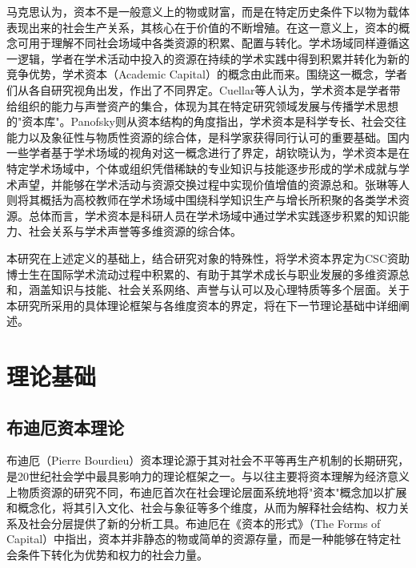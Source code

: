 马克思认为，资本不是一般意义上的物或财富，而是在特定历史条件下以物为载体表现出来的社会生产关系，其核心在于价值的不断增殖\cite{marx2004}。在这一意义上，资本的概念可用于理解不同社会场域中各类资源的积累、配置与转化。学术场域同样遵循这一逻辑，学者在学术活动中投入的资源在持续的学术实践中得到积累并转化为新的竞争优势，学术资本（Academic Capital）的概念由此而来。围绕这一概念，学者们从各自研究视角出发，作出了不同界定。Cuellar等人认为，学术资本是学者带给组织的能力与声誉资产的集合，体现为其在特定研究领域发展与传播学术思想的"资本库"\cite{cuellar2016}。Panofsky则从资本结构的角度指出，学术资本是科学专长、社会交往能力以及象征性与物质性资源的综合体，是科学家获得同行认可的重要基础\cite{panofsky2011}。国内一些学者基于学术场域的视角对这一概念进行了界定，胡钦晓认为，学术资本是在特定学术场域中，个体或组织凭借稀缺的专业知识与技能逐步形成的学术成就与学术声望，并能够在学术活动与资源交换过程中实现价值增值的资源总和\cite{huqinxiao2020}。张琳等人则将其概括为高校教师在学术场域中围绕科学知识生产与增长所积聚的各类学术资源\cite{zhanglin2024}。总体而言，学术资本是科研人员在学术场域中通过学术实践逐步积累的知识能力、社会关系与学术声誉等多维资源的综合体。

本研究在上述定义的基础上，结合研究对象的特殊性，将学术资本界定为CSC资助博士生在国际学术流动过程中积累的、有助于其学术成长与职业发展的多维资源总和，涵盖知识与技能、社会关系网络、声誉与认可以及心理特质等多个层面。关于本研究所采用的具体理论框架与各维度资本的界定，将在下一节理论基础中详细阐述。

\section{理论基础}

\subsection{布迪厄资本理论}

布迪厄（Pierre Bourdieu）资本理论源于其对社会不平等再生产机制的长期研究，是20世纪社会学中最具影响力的理论框架之一。与以往主要将资本理解为经济意义上物质资源的研究不同，布迪厄首次在社会理论层面系统地将"资本"概念加以扩展和概念化，将其引入文化、社会与象征等多个维度，从而为解释社会结构、权力关系及社会分层提供了新的分析工具。布迪厄在《资本的形式》（The Forms of Capital）中指出，资本并非静态的物或简单的资源存量，而是一种能够在特定社会条件下转化为优势和权力的社会力量\cite{bourdieu1986}。

